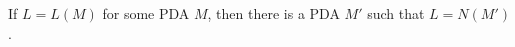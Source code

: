 

\setcounter{section}{6}
\setcounter{subsection}{3}
\setcounter{dfn}{8}

\begin{thm}
If $L = L(M)$ for some PDA $M$, then there is a PDA $M'$ such that $L = N(M')$.
\end{thm}

